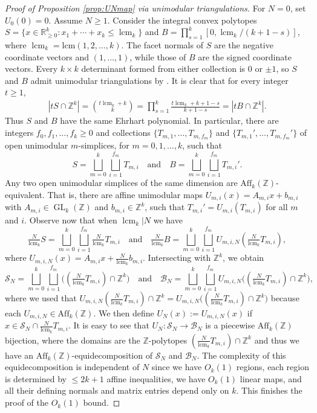 \documentclass[a4paper,reqno,12pt]{amsart}
\theoremstyle{plain}
\theoremstyle{plain}
\theoremstyle{remark}
\theoremstyle{plain}
\newcommand{\B}{\mathscr{B}}
\newcommand{\cS}{\mathscr{S}}
\newcommand{\RR}{\mathbb{R}}
\newcommand{\aff}{\text{Aff}}
\newcommand{\GL}{\operatorname{GL}}
\newcommand{\Z}{\mathbb{Z}}
\newcommand{\lcmk}{\operatorname{lcm}_k}
\theoremstyle{plain}
\theoremstyle{plain}
\begin{document}
{\begin{proof}[Proof of Proposition \ref{prop:UNmap} via {unimodular} triangulations]
{For $N=0$, set $U_0(0)=0$. Assume $N\geq1$.} Consider the integral convex polytopes $S=\{x\in \RR_{\geq 0}^k : x_1+\cdots{+} x_k \leq \lcmk\}$ and $B = \prod_{s=1}^k [0,\lcmk/(k+1-s)] $, where $\lcmk=\text{lcm}(1,2,\ldots,k)$. {The facet normals of $S$ are the negative coordinate vectors and $(1,\ldots,1)$, while those of $B$ are the signed coordinate vectors. Every $k\times k$ determinant formed from either collection is $0$ or $\pm1$, so $S$ and $B$ admit unimodular triangulations by \cite[Theorem~6.3.3]{HNP}.} It is clear that for every integer $t\geq1$,
\begin{align*}
|t {S} \cap\Z^k|
=\binom{t \lcmk+k}{k}
=\prod_{s=1}^k\frac{t\lcmk+k+1-s}{k+1-s}
=|tB\cap\Z^k|.
\end{align*}
Thus ${S}$ and $B$ have the same Ehrhart polynomial. In particular, there are integers $f_0,f_1,\ldots,{f_k}\geq 0$ and collections $\{T_{m,1},\ldots, T_{m,f_m}\}$ and $\{T_{m,1}',\ldots, T_{m,f_m}'\}$ of open unimodular $m$-simplices, for $m=0,1,\ldots,k$, such that 
\[
S=\bigsqcup_{m=0}^{k} \bigsqcup_{i=1}^{f_m} T_{m,i} \quad \text{and} \quad B=\bigsqcup_{m=0}^{k} \bigsqcup_{i=1}^{f_m} T_{m,i}'.
\]
Any two open unimodular simplices {of the same dimension} are ${\aff_k(\Z)}$-equivalent{. That} is, there are
affine unimodular maps $U_{m,i}(x)=A_{m,i}x+b_{m,i}$ with $A_{m,i}\in\GL_k(\Z)$ and $b_{m,i}\in\Z^k$, 
such that $T_{m,i}'=U_{m,i}(T_{m,i})$ for all $m$ and $i$. Observe now that  when $\lcmk|N$ we have
\[
\tfrac{N}{\lcmk}S=\bigsqcup_{m=0}^{k} \bigsqcup_{i=1}^{f_m} \tfrac{N}{\lcmk} T_{m,i} \quad \text{and} \quad {\tfrac{N}{\lcmk}}B=\bigsqcup_{m=0}^{k} \bigsqcup_{i=1}^{f_m} U_{m,i,N}(\tfrac{N}{\lcmk} T_{m,i}),
\]
where $U_{m,i,N}(x)=A_{m,i}x+\frac{N}{\lcmk}b_{m,i}$. Intersecting with $\Z^k$, we obtain
\[
\cS_N =\bigsqcup_{m=0}^{k} \bigsqcup_{i=1}^{f_m} \big((\tfrac{N}{\lcmk} T_{m,i}) \cap \Z^k\big) \quad \text{and}\quad \B_N =\bigsqcup_{m=0}^{k} \bigsqcup_{i=1}^{f_m} U_{m,i,N}\big((\tfrac{N}{\lcmk} T_{m,i}) \cap \Z^k\big), 
\]
where we used that $U_{m,i,N}(\tfrac{N}{\lcmk} T_{m,i}) \cap \Z^k = U_{m,i,N}\big((\tfrac{N}{\lcmk} T_{m,i}) \cap \Z^k\big) $ because each $U_{m,i,N} \in \aff_k(\Z)$. We then define $U_N(x):=U_{m,i,N}(x)$ if $x\in \cS_N \cap \frac{N}{\lcmk} T_{m,i}$. It is easy to see that $U_{N}: \cS_N \to \B_N$ {is a} piecewise $\aff_k(\Z)$ bijection, where the domains are the $\Z$-polytopes $(\frac{N}{\lcmk} T_{m,i} ) \cap \Z^k$ and thus we have an $\aff_k(\Z)$-equidecomposition of $\cS_N$ and $\B_N$. The complexity of this equidecomposition is independent of $N$ since we have $O_k(1)$ regions, each region is determined by $\leq 2k+1$ affine inequalities, we have $O_k(1)$ linear maps{, and all their defining normals and matrix entries depend only on $k$}. This finishes the proof{ of the $O_k(1)$ bound{.}}
\end{proof}

}
\end{document}
